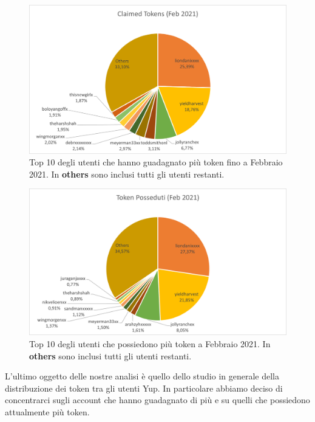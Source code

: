\begin{figure}[t]
    \centering
    \includegraphics[width=1\textwidth]{graphs/token_claimed_february.png}
    \caption{Top 10 degli utenti che hanno guadagnato più token fino a Febbraio 2021. In \textbf{others} sono inclusi tutti gli utenti restanti.}
    \label{fig: tokens_claimed_feb}
\end{figure}    
\begin{figure}[t]
    \centering
    \includegraphics[width=1\textwidth]{graphs/token_posseduti_february.png}
    \caption{Top 10 degli utenti che possiedono più token a Febbraio 2021. In \textbf{others} sono inclusi tutti gli utenti restanti.}
    \label{fig: tokens_hold_feb}
\end{figure}

L'ultimo oggetto delle nostre analisi è quello dello studio in generale della distribuzione dei token tra gli utenti Yup. In particolare abbiamo deciso di concentrarci sugli account che hanno guadagnato di più e su quelli che possiedono attualmente più token.

